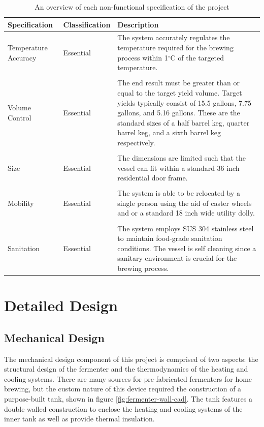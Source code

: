 \documentclass{article}
\begin{document}
\begin{table}[H]
\caption{An overview of each non-functional specification of the project}
\centering
\begin{tabularx}{\textwidth}{l l Z}
\toprule
\textbf{Specification} & \textbf{Classification} & \textbf{Description} \\ 
\midrule
Temperature Accuracy
& Essential
& The system accurately regulates the temperature required for the brewing process within 1$^{\circ}$C of the targeted temperature.
\\\\
Volume Control
& Essential
& The end result must be greater than or equal to the target yield volume.  Target yields typically consist of 15.5 gallons, 7.75 gallons, and 5.16 gallons.  These are the standard sizes of a half barrel keg, quarter barrel keg, and a sixth barrel keg respectively.
\\\\
Size
& Essential
& The dimensions are limited such that the vessel can fit within a standard 36 inch residential door frame.
\\\\
Mobility
& Essential
& The system is able to be relocated by a single person using the aid of caster wheels and or a standard 18 inch wide utility dolly.
\\\\
Sanitation
& Essential
& The system employs SUS 304 stainless steel to maintain food-grade sanitation conditions.  The vessel is self cleaning since a sanitary environment is crucial for the brewing process.
\\
\bottomrule
\end{tabularx}
\label{tab:non-func}
\end{table}
\pagebreak

\section{Detailed Design}
\subsection{Mechanical Design}
The mechanical design component of this project is comprised of two aspects: the structural design of the fermenter and the thermodynamics of the heating and cooling systems.  There are many sources for pre-fabricated fermenters for home brewing, but the custom nature of this device required the construction of a purpose-built tank, shown in figure \ref{fig:fermenter-wall-cad}.  The tank features a double walled construction to enclose the heating and cooling systems of the inner tank as well as provide thermal insulation.
\end{document}
